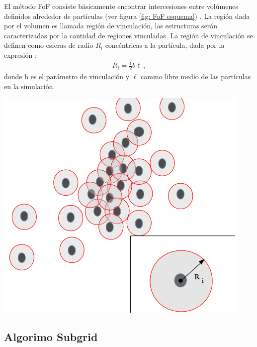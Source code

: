 El método FoF consiste básicamente encontrar intercesiones entre volúmenes definidos alrededor de partículas (ver figura  \ref{fig: FoF esquema}) . La región dada por el volumen es llamada región de vinculación, las estructuras serán caracterizadas por la cantidad de regiones vinculadas. La región de vinculación se definen como esferas de radio $R_{i}$ concéntricas a la partícula, dada por la expresión \cite{bustamente01}:
%
\begin{align}
    R_{i}=\frac{1}{2}b\ell\,,
\end{align}
%
donde b es el parámetro de vinculación y $\ell$ camino libre medio de las partículas en la simulación. 
%
\begin{center}
\includegraphics[scale=.35]{./figures/5_Algoritmo_Modelacion/FoF_metodo.png}
\label{fig: FoF esquema}
\end{center}
%

    \subsection{Algorimo Subgrid}
    \label{subsec: Algoritmo subgrid}

